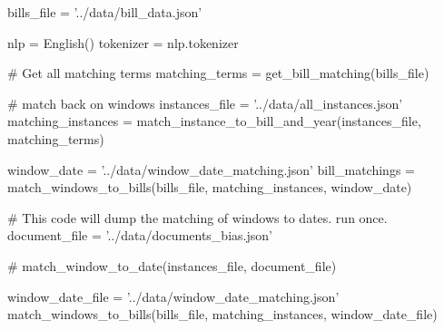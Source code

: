 \begin{pyin}
bills_file = '../data/bill_data.json'


nlp = English()
tokenizer = nlp.tokenizer

# Get all matching terms
matching_terms = get_bill_matching(bills_file)

# match back on windows
instances_file = '../data/all_instances.json'
matching_instances = match_instance_to_bill_and_year(instances_file, matching_terms)


window_date = '../data/window_date_matching.json'
bill_matchings = match_windows_to_bills(bills_file, matching_instances, window_date)

# This code will dump the matching of windows to dates. run once.
document_file = '../data/documents_bias.json'

# match_window_to_date(instances_file, document_file)

window_date_file = '../data/window_date_matching.json'
match_windows_to_bills(bills_file, matching_instances, window_date_file)
\end{pyin}
